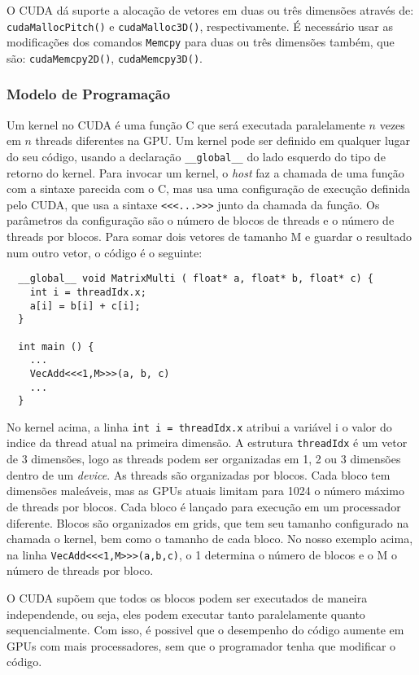 O CUDA dá suporte a alocação de vetores em duas ou três dimensões através de: \verb#cudaMallocPitch()# e 
\verb#cudaMalloc3D()#, respectivamente. É necessário usar as modificações dos comandos \verb#Memcpy# para
duas ou três dimensões também, que são: \verb#cudaMemcpy2D()#, \verb#cudaMemcpy3D()#.

\subsubsection{Modelo de Programação}
Um kernel no CUDA é uma função C que será executada paralelamente $n$ vezes em $n$ threads diferentes na GPU. Um kernel pode ser
definido em qualquer lugar do seu código, usando a declaração \verb#__global__# do lado esquerdo do tipo de retorno do kernel.
Para invocar um kernel, o \textit{host} faz a chamada de uma função com a sintaxe parecida com o C, mas usa uma configuração de
execução definida pelo CUDA, que usa a sintaxe \verb#<<<...>>># junto da chamada da função. Os parâmetros da configuração são
o número de blocos de threads e o número de threads por blocos. Para somar dois vetores de tamanho M e guardar o resultado num
outro vetor, o código é o seguinte:

\begin{verbatim}
  __global__ void MatrixMulti ( float* a, float* b, float* c) { 
    int i = threadIdx.x;
    a[i] = b[i] + c[i];        
  }
                            
  int main () {               
    ...                       
    VecAdd<<<1,M>>>(a, b, c)  
    ...                       
  }                                 
\end{verbatim}

No kernel acima, a linha \verb#int i = threadIdx.x# atribui a variável i o valor do indice da thread atual na primeira dimensão. 
A estrutura \verb#threadIdx# é um vetor de 3 dimensões, logo as threads podem ser organizadas em 1, 2 ou 3 dimensões dentro de um
\textit{device}. As threads são organizadas por blocos. Cada bloco tem dimensões maleáveis, mas as GPUs atuais limitam para 1024 o 
número máximo de threads por blocos. Cada bloco é lançado para execução em um processador diferente. Blocos são organizados em 
grids, que tem seu tamanho configurado na chamada o kernel, bem como o tamanho de cada bloco. No nosso exemplo acima, na linha
\verb#VecAdd<<<1,M>>>(a,b,c)#, o 1 determina o número de blocos e o M o número de threads por bloco.

O CUDA supõem que todos os blocos podem ser executados de maneira independende, ou seja, eles podem executar tanto paralelamente
quanto sequencialmente. Com isso, é possivel que o desempenho do código aumente em GPUs com mais processadores, sem que o programador
tenha que modificar o código.

